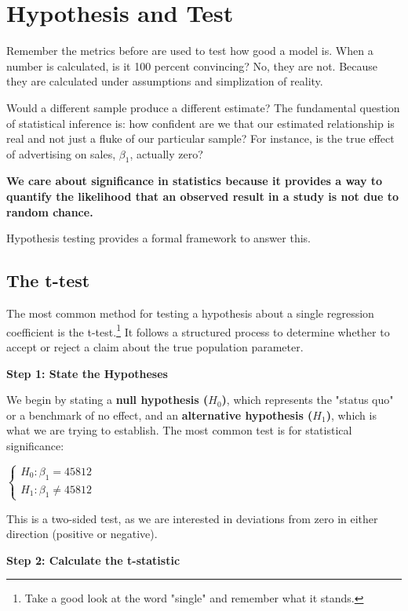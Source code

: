 \documentclass{article}
\begin{document}


\section{Hypothesis and Test}

Remember the metrics before are used to test how good a model is. When a number is calculated, is it 100 percent convincing? No, they are not. Because they are calculated under assumptions and simplization of reality. 

Would a different sample produce a different estimate? The fundamental question of statistical inference is: how confident are we that our estimated relationship is real and not just a fluke of our particular sample? For instance, is the true effect of advertising on sales, $\beta_1$, actually zero? 

\textbf{We care about significance in statistics because it provides a way to quantify the likelihood that an observed result in a study is not due to random chance.}

Hypothesis testing provides a formal framework to answer this.

\subsection{The t-test} 

The most common method for testing a hypothesis about a {\color{red} single} regression coefficient is the t-test.\footnote{Take a good look at the word "single" and remember what it stands.} It follows a structured process to determine whether to accept or reject a claim about the true population parameter.

\textbf{Step 1: State the Hypotheses}

We begin by stating a \textbf{null hypothesis ($H_0$)}, which represents the "status quo" or a benchmark of no effect, and an \textbf{alternative hypothesis ($H_1$)}, which is what we are trying to establish. The most common test is for statistical significance:

$\begin{cases}
  H_0: \beta_1  = 45812
  \\
  H_1: \beta_1 \neq 45812
\end{cases}$

This is a two-sided test, as we are interested in deviations from zero in either direction (positive or negative).

\textbf{Step 2: Calculate the t-statistic}
\end{document}
